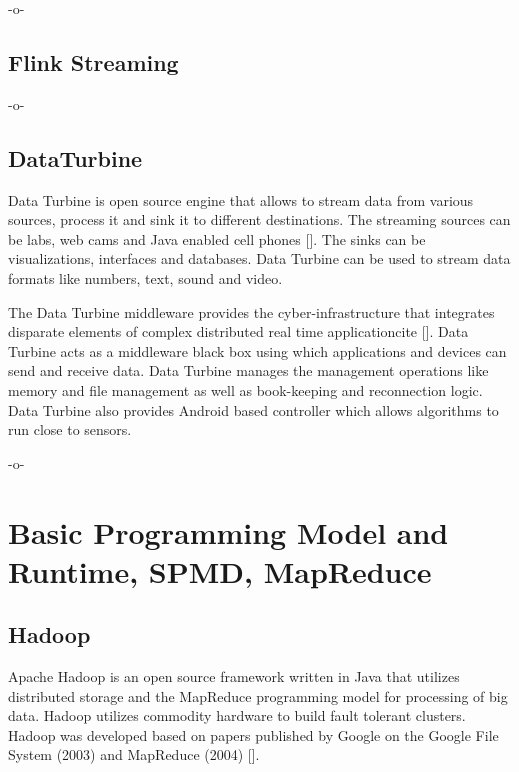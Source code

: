      -o-
     
\subsection{Flink Streaming}

-o-

\subsection{DataTurbine}

Data Turbine is open source engine that allows to stream data from
various sources, process it and sink it to different destinations. The
streaming sources can be labs, web cams and Java enabled cell
phones [\cite{www-data-turbine}].  The sinks can be visualizations,
interfaces and databases.  Data Turbine can be used to stream data
formats like numbers, text, sound and video.

The Data Turbine middleware provides the cyber-infrastructure that
integrates disparate elements of complex distributed real time
applicationcite [\cite{osdt-ecologicalsociety}]. Data Turbine acts as a
middleware black box using which applications and devices can send and
receive data. Data Turbine manages the management operations like
memory and file management as well as book-keeping and reconnection
logic.  Data Turbine also provides Android based controller which
allows algorithms to run close to sensors.

     -o-


\section{Basic Programming Model and Runtime, SPMD, MapReduce}
\label{S:o-prg-model}


\subsection{Hadoop}

Apache Hadoop is an open source framework written in Java that
utilizes distributed storage and the MapReduce programming model for
processing of big data. Hadoop utilizes commodity hardware to build
fault tolerant clusters.  Hadoop was developed based on papers
published by Google on the Google File System (2003) and MapReduce
(2004) [\cite{www-wikihadoop}].

